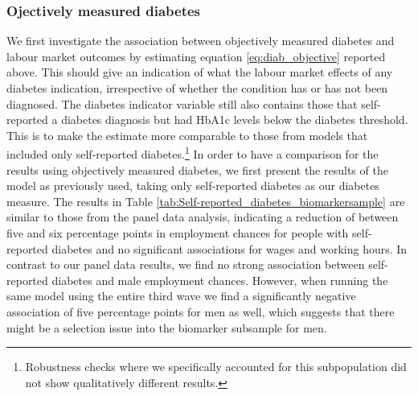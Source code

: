 \subsubsection*{Ojectively measured diabetes}
We first investigate the association between objectively measured
diabetes and labour market outcomes by estimating equation \ref{eq:diab_objective}
reported above. This should give an indication of what the labour
market effects of any diabetes indication, irrespective of whether
the condition has or has not been diagnosed. The diabetes indicator
variable still also contains those that self-reported a diabetes diagnosis
but had \ac{HbA1c} levels below the diabetes threshold. This is
to make the estimate more comparable to those from models that included
only self-reported diabetes.\footnote{Robustness checks where we specifically accounted for this subpopulation
did not show qualitatively different results.} In order to have a comparison for the results using objectively measured
diabetes, we first present the results of the model as previously
used, taking only self-reported diabetes as our diabetes measure.
The results in Table \ref{tab:Self-reported_diabetes_biomarkersample}
are similar to those from the panel data analysis, indicating a reduction
of between five and six percentage points in employment chances for
people with self-reported diabetes and no significant associations
for wages and working hours. In contrast to our panel data results,
we find no strong association between self-reported diabetes and male
employment chances. However, when running the same model using the
entire third wave we find a significantly negative association of
five percentage points for men as well, which suggests that there
might be a selection issue into the biomarker subsample for men.

